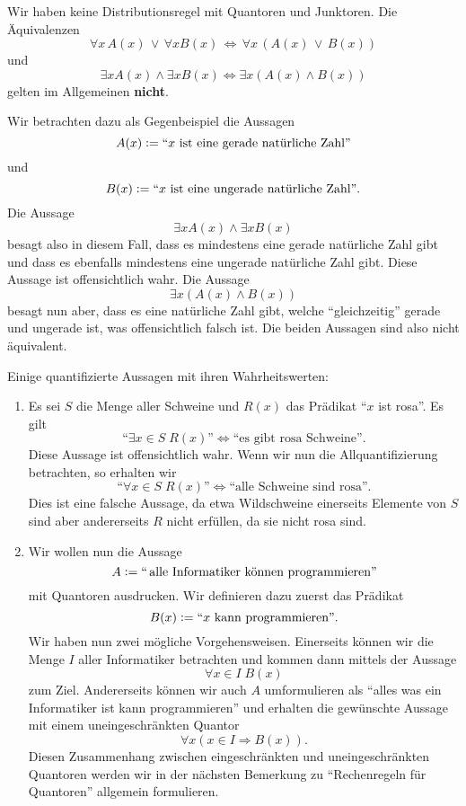 \begin{remark}
    Wir haben keine Distributionsregel mit Quantoren und Junktoren. Die Äquivalenzen
    $$
        \forall x\, A(x)\,\lor\,\forall x B(x)\,\Leftrightarrow\, \forall x\,(A(x)\,\lor\, B(x))
    $$
    und
    $$
        \exists x A(x)\wedge\exists x B(x)\Leftrightarrow \exists x (A(x)\wedge B(x))
    $$
    gelten im Allgemeinen \textbf{nicht}.

    Wir betrachten dazu als Gegenbeispiel die Aussagen
    $$
        A(x):=``x \text{ ist eine gerade natürliche Zahl''}
    $$
    und
    $$
        B(x):=``x\text{ ist eine ungerade natürliche Zahl''}.
    $$
    Die Aussage
    $$
        \exists x A(x)\wedge\exists x B(x)
    $$
    besagt also in diesem Fall, dass es mindestens eine gerade natürliche Zahl gibt und dass es ebenfalls mindestens eine ungerade natürliche Zahl gibt. Diese Aussage ist offensichtlich wahr. Die Aussage
    $$
        \exists x (A(x)\wedge B(x))
    $$
    besagt nun aber, dass es eine natürliche Zahl gibt, welche ``gleichzeitig'' gerade und ungerade ist, was offensichtlich falsch ist. Die beiden Aussagen sind also nicht äquivalent.
\end{remark}

\begin{example}
    Einige quantifizierte Aussagen mit ihren Wahrheitswerten:
    \begin{enumerate}
        \item Es sei $S$ die Menge aller Schweine und $R(x)$ das Prädikat ``$x$ ist rosa''. Es gilt
            $$
                \text{``}\exists x\in S\; R(x)\text{''}\Leftrightarrow\text{``es gibt rosa Schweine''}.
            $$
            Diese Aussage ist offensichtlich wahr. Wenn wir nun die Allquantifizierung betrachten, so erhalten wir
            $$
                \text{``}\forall x\in S\; R(x)\text{''}\Leftrightarrow\text{``alle Schweine sind rosa''}.
            $$
            Dies ist eine falsche Aussage, da etwa Wildschweine einerseits Elemente von $S$ sind aber andererseits $R$ nicht erfüllen, da sie nicht rosa sind.
        \item Wir wollen nun die Aussage
            $$
                A:=``\,\text{alle Informatiker können programmieren''}
            $$
            mit Quantoren ausdrucken.
            Wir definieren dazu zuerst das Prädikat
            $$
                B(x):=``x\text{ kann programmieren''}.
            $$
            Wir haben nun zwei mögliche Vorgehensweisen. Einerseits können wir die Menge $I$ aller Informatiker betrachten und kommen dann mittels der Aussage
            $$
                \forall x\in I\;B(x)
            $$
            zum Ziel. Andererseits können wir auch $A$ umformulieren als ``alles was ein Informatiker ist kann programmieren'' und erhalten die gewünschte Aussage mit einem uneingeschränkten Quantor
            $$
                \forall x(x\in I\Rightarrow B(x)).
            $$
            Diesen Zusammenhang zwischen eingeschränkten und uneingeschränkten Quantoren werden wir in der nächsten Bemerkung zu ``Rechenregeln für Quantoren'' allgemein formulieren.
    \end{enumerate}
\end{example}

